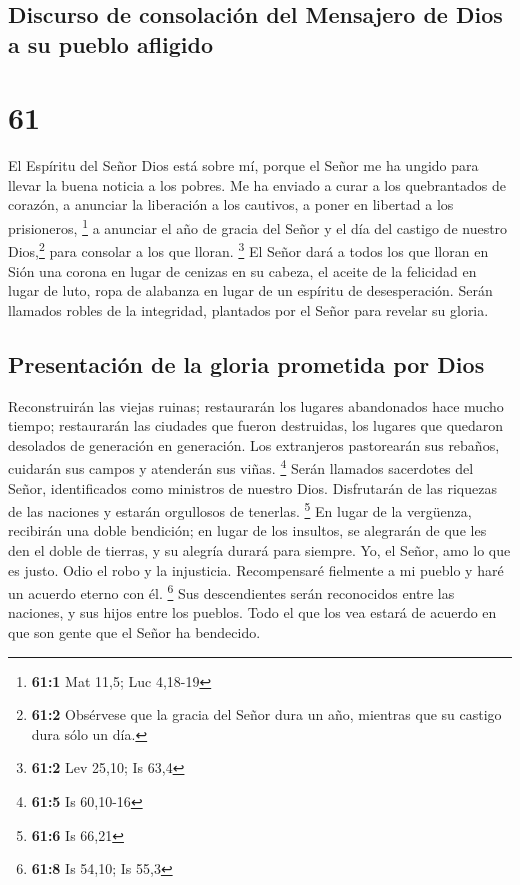 \hypertarget{discurso-de-consolaciuxf3n-del-mensajero-de-dios-a-su-pueblo-afligido}{%
\subsection{Discurso de consolación del Mensajero de Dios a su pueblo
afligido}\label{discurso-de-consolaciuxf3n-del-mensajero-de-dios-a-su-pueblo-afligido}}

\hypertarget{section-60}{%
\section{61}\label{section-60}}

 El Espíritu del Señor Dios está sobre mí, porque el Señor
me ha ungido para llevar la buena noticia a los pobres. Me ha enviado a
curar a los quebrantados de corazón, a anunciar la liberación a los
cautivos, a poner en libertad a los prisioneros, \footnote{\textbf{61:1}
  Mat 11,5; Luc 4,18-19}  a anunciar el año de gracia del
Señor y el día del castigo de nuestro Dios,\footnote{\textbf{61:2}
  Obsérvese que la gracia del Señor dura un año, mientras que su castigo
  dura sólo un día.} para consolar a los que lloran. \footnote{\textbf{61:2}
  Lev 25,10; Is 63,4}  El Señor dará a todos los que
lloran en Sión una corona en lugar de cenizas en su cabeza, el aceite de
la felicidad en lugar de luto, ropa de alabanza en lugar de un espíritu
de desesperación. Serán llamados robles de la integridad, plantados por
el Señor para revelar su gloria.

\hypertarget{presentaciuxf3n-de-la-gloria-prometida-por-dios}{%
\subsection{Presentación de la gloria prometida por
Dios}\label{presentaciuxf3n-de-la-gloria-prometida-por-dios}}

 Reconstruirán las viejas ruinas; restaurarán los lugares
abandonados hace mucho tiempo; restaurarán las ciudades que fueron
destruidas, los lugares que quedaron desolados de generación en
generación.  Los extranjeros pastorearán sus rebaños,
cuidarán sus campos y atenderán sus viñas. \footnote{\textbf{61:5} Is
  60,10-16}  Serán llamados sacerdotes del Señor,
identificados como ministros de nuestro Dios. Disfrutarán de las
riquezas de las naciones y estarán orgullosos de tenerlas. \footnote{\textbf{61:6}
  Is 66,21}  En lugar de la vergüenza, recibirán una doble
bendición; en lugar de los insultos, se alegrarán de que les den el
doble de tierras, y su alegría durará para siempre.  Yo,
el Señor, amo lo que es justo. Odio el robo y la injusticia.
Recompensaré fielmente a mi pueblo y haré un acuerdo eterno con él.
\footnote{\textbf{61:8} Is 54,10; Is 55,3}  Sus
descendientes serán reconocidos entre las naciones, y sus hijos entre
los pueblos. Todo el que los vea estará de acuerdo en que son gente que
el Señor ha bendecido.

